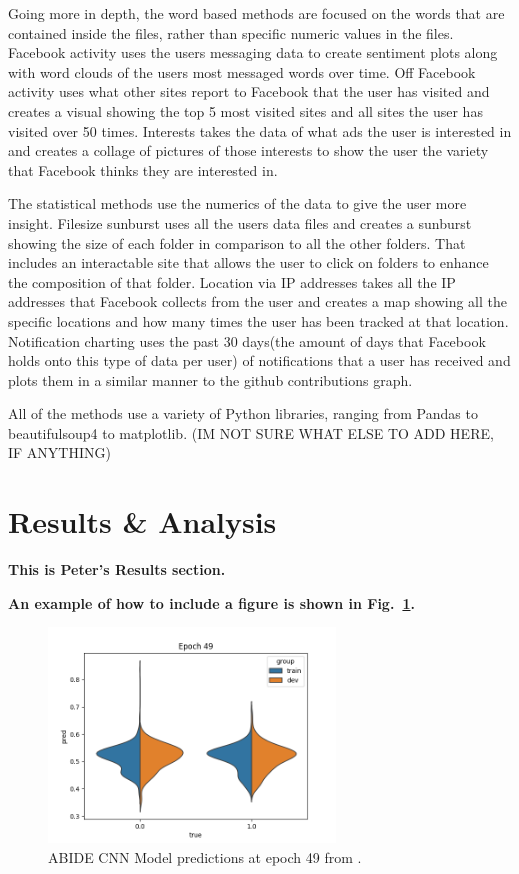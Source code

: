 \documentclass[conference, letterpaper, 11pt]{IEEEtran}
\begin{document}
Going more in depth, the word based methods are focused on the words that are contained inside the files, rather than specific numeric values in the files. Facebook activity uses the users messaging data to create sentiment plots along with word clouds of the users most messaged words over time. Off Facebook activity uses what other sites report to Facebook that the user has visited and creates a visual showing the top 5 most visited sites and all sites the user has visited over 50 times. Interests takes the data of what ads the user is interested in and creates a collage of pictures of those interests to show the user the variety that Facebook thinks they are interested in.

The statistical methods use the numerics of the data to give the user more insight. Filesize sunburst uses all the users data files and creates a sunburst showing the size of each folder in comparison to all the other folders. That includes an interactable site that allows the user to click on folders to enhance the composition of that folder. Location via IP addresses takes all the IP addresses that Facebook collects from the user and creates a map showing all the specific locations and how many times the user has been tracked at that location. Notification charting uses the past 30 days(the amount of days that Facebook holds onto this type of data per user) of notifications that a user has received and plots them in a similar manner to the github contributions graph.

All of the methods use a variety of Python libraries, ranging from Pandas to beautifulsoup4 to matplotlib. (IM NOT SURE WHAT ELSE TO ADD HERE, IF ANYTHING)

\section{Results \& Analysis} \label{RA}
\textbf{This is Peter's Results section.} \lipsum[1]

\textbf{An example of how to include a figure is shown in Fig.~\ref{fig:xmp}.} \lipsum[1]

\begin{figure}[htbp]
    \centerline{\includegraphics[width=3in]{img/3-1e49violin.png}}
    \caption{ABIDE CNN Model predictions at epoch 49 from \cite{aiad}.}
    \label{fig:xmp}
\end{figure}
\end{document}
